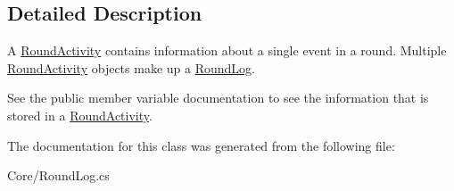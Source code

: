 \subsection{Detailed Description}
A \hyperlink{class_m_b_c_1_1_core_1_1_round_log_1_1_round_activity}{Round\-Activity} contains information about a single event in a round. Multiple \hyperlink{class_m_b_c_1_1_core_1_1_round_log_1_1_round_activity}{Round\-Activity} objects make up a \hyperlink{class_m_b_c_1_1_core_1_1_round_log}{Round\-Log}. 

See the public member variable documentation to see the information that is stored in a \hyperlink{class_m_b_c_1_1_core_1_1_round_log_1_1_round_activity}{Round\-Activity}. 

The documentation for this class was generated from the following file\-:\begin{DoxyCompactItemize}
\item 
Core/Round\-Log.\-cs\end{DoxyCompactItemize}
